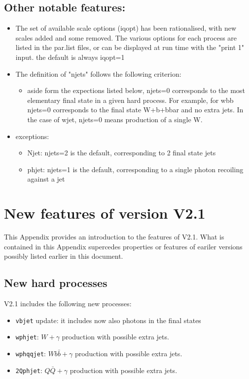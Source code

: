\documentclass[paper]{JHEP3}
\begin{document}
\begin{appendix}
\subsection{Other notable features:}
\begin{itemize}
\item The set of available scale options (iqopt) has been rationalised,
  with new scales added and some removed. The various options for each
  process are listed in the par.list files, or can be displayed at run
  time with the "print 1" input. the default is always iqopt=1
\item The definition of "njets" follows the following criterion:
  \begin{itemize}
  \item aside form the expections listed below, njets=0 corresponds to the
    most elementary final state in a given hard process. For example,
    for wbb njets=0 corresponds to the final state W+b+bbar and no extra
    jets. In the case of wjet, njets=0 means production of a single W. 
  \end{itemize} 
\item exceptions:
  \begin{itemize}
  \item Njet: njets=2 is the default, corresponding to 2 final state
    jets
  \item phjet: njets=1 is the default, corresponding to a single photon
    recoiling against a jet
  \end{itemize} 
\end{itemize} 

\section{New features of version V2.1}
\label{sec:v21}
This Appendix provides an introduction to the features of V2.1. What
is contained in this Appendix supercedes properties or features of
eariler versions possibly listed earlier in this document.

\subsection{New hard processes}
V2.1 includes the following new processes:
\begin{itemize}
 \item{\tt vbjet} update: it includes now also photons in the final states 
  \item {\tt wphjet}: $W + \gamma$ production with possible extra jets.
  \item {\tt wphqqjet}: $W b {\bar b} + \gamma$ 
        production with possible extra jets.
  \item {\tt 2Qphjet}: ${Q \bar Q} + \gamma$ production with possible 
        extra jets.
\end{itemize} 


\end{appendix}
\end{document}
